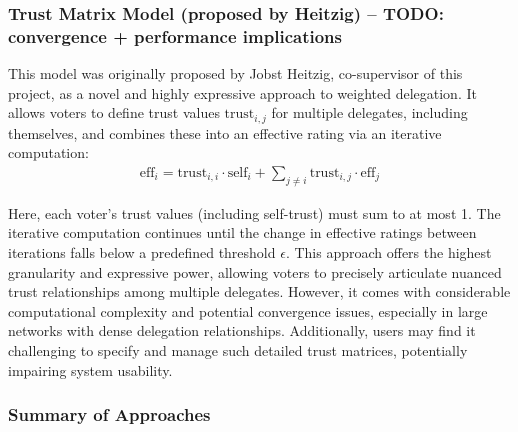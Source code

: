 \subsubsection*{Trust Matrix Model (proposed by Heitzig) -- TODO: convergence + performance implications}

This model was originally proposed by Jobst Heitzig, co-supervisor of this project, as a novel and highly expressive approach to weighted delegation. It allows voters to define trust values \( \text{trust}_{i,j} \) for multiple delegates, including themselves, and combines these into an effective rating via an iterative computation:
\begin{gather}
  \text{eff}_i = \text{trust}_{i,i} \cdot \text{self}_i + \sum_{j \neq i}\text{trust}_{i,j} \cdot \text{eff}_j
\end{gather}

Here, each voter's trust values (including self-trust) must sum to at most 1. The iterative computation continues until the change in effective ratings between iterations falls below a predefined threshold \( \epsilon \). This approach offers the highest granularity and expressive power, allowing voters to precisely articulate nuanced trust relationships among multiple delegates. However, it comes with considerable computational complexity and potential convergence issues, especially in large networks with dense delegation relationships. Additionally, users may find it challenging to specify and manage such detailed trust matrices, potentially impairing system usability.

\subsubsection*{Summary of Approaches}

